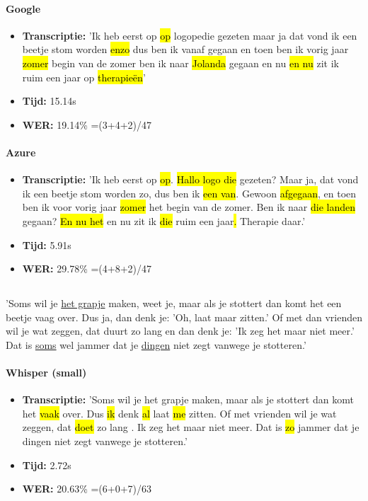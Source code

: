 \paragraph{Google}
\begin{itemize}
\item \textbf{Transcriptie:} 'Ik heb eerst op \hl{op} logopedie gezeten maar ja dat vond ik een beetje stom worden \hl{enzo} dus ben ik\hl{ }vanaf gegaan en toen ben ik vorig jaar \hl{zomer} begin van de zomer ben ik naar \hl{Jolanda} gegaan en nu \hl{en nu} zit ik ruim een jaar op \hl{therapieën}'
\item \textbf{Tijd:} 15.14s
\item \textbf{WER:} 19.14\% =(3+4+2)/47
\end{itemize}

\paragraph{Azure}
\begin{itemize}
\item \textbf{Transcriptie:} 'Ik heb eerst op \hl{op}. \hl{Hallo logo die} gezeten? Maar ja, dat vond ik een beetje stom worden zo, dus ben ik \hl{een van}. Gewoon\hl{ afgegaan}, en toen ben ik voor vorig jaar \hl{zomer} het begin van de zomer. Ben ik naar \hl{die landen} gegaan? \hl{En nu het} en nu zit ik \hl{die} ruim een jaar\hl{. }Therapie daar.'
\item \textbf{Tijd:} 5.91s
\item \textbf{WER:} 29.78\% =(4+8+2)/47
\end{itemize}

\subsection{}%
'Soms wil je \underline{het grapje} maken, weet je, maar als je stottert dan komt het een beetje vaag over. Dus ja, dan denk je: 'Oh, laat maar zitten.' Of met dan vrienden wil je wat zeggen, dat duurt zo lang en dan denk je: 'Ik zeg het maar niet meer.' Dat is \underline{soms} wel jammer dat je \underline{dingen} niet zegt vanwege je stotteren.'

\paragraph{Whisper (small)}
\begin{itemize}
    \item \textbf{Transcriptie:} 'Soms wil je het grapje maken, maar als je stottert dan komt het\hl{ vaak} over. Dus\hl{ ik} denk \hl{al} laat \hl{me} zitten. Of met vrienden wil je wat zeggen, dat \hl{doet} zo lang\hl{ }. Ik zeg het maar niet meer. Dat is \hl{zo} jammer dat je dingen niet zegt vanwege je stotteren.'
    \item \textbf{Tijd:} 2.72s
    \item \textbf{WER:} 20.63\% =(6+0+7)/63
\end{itemize}


